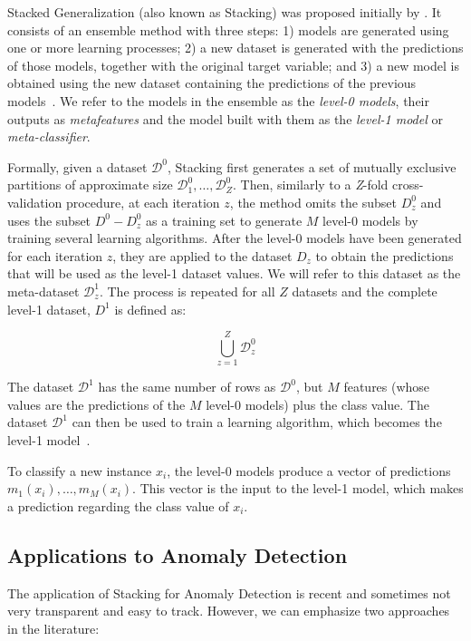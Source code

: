 {Stacked Generalization (also known as Stacking) was proposed initially by \textcite{wolpert1992stacked}.
It consists of an ensemble method with three steps: 1) models are generated using one or more learning processes; 2) a new dataset is generated with the predictions of those models, together with the original target variable; and 3) a new model is obtained using the new dataset containing the predictions of the previous models~\cite{Sesmero2015}.
We refer to the models in the ensemble as the \textit{level-0 models}, their outputs as \textit{metafeatures} and the model built with them as the \textit{level-1 model} or \textit{meta-classifier}.

Formally, given a dataset $\mathcal{D}^0$, Stacking first generates a set of mutually exclusive partitions of approximate size $\mathcal{D}^0_1, \dots, \mathcal{D}^0_Z$. Then, similarly to a \textit{Z}-fold cross-validation procedure, at each iteration $z$, the method omits the subset $D^0_z$ and uses the subset $D^0 - D^0_z$ as a training set to generate $M$ level-0 models by training several learning algorithms.%
After the level-0 models have been generated for each
iteration $z$, they are applied to the dataset $D_z$ to obtain the predictions that will be used as the level-1 dataset values. We will refer to this dataset as the meta-dataset $\mathcal{D}^1_z$. The process is repeated for all $Z$ datasets and the complete level-1 dataset, $D^1$ is defined as:

\begin{equation}
\bigcup\limits_{z=1}^{Z} \mathcal{D}^0_z
\end{equation}

The dataset $\mathcal{D}^1$ has the same number of rows as $\mathcal{D}^0$, but $M$ features (whose values are the predictions of the $M$ level-0 models) plus the class value.
The dataset $\mathcal{D}^1$ can then be used to train a learning algorithm, which becomes the level-1 model~\cite{Sesmero2015}.

To classify a new instance $x_i$, the level-0 models produce a vector of predictions ${m_1(x_i), \dots, m_M(x_i)}$.
This vector is the input to the level-1 model, which makes a prediction regarding the class value of $x_i$.

\subsection{Applications to Anomaly Detection}

The application of Stacking for Anomaly Detection is recent and sometimes not very transparent and easy to track.
However, we can emphasize two approaches in the literature:

}
